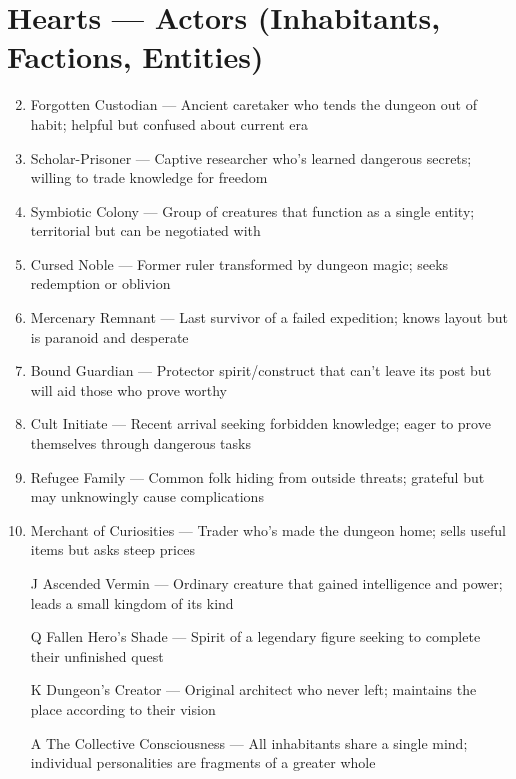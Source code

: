 \section*{Hearts --- Actors (Inhabitants, Factions, Entities)}
\begin{enumerate}
\setcounter{enumi}{1}
\item Forgotten Custodian --- Ancient caretaker who tends the dungeon out of habit; helpful but confused about current era
\item Scholar-Prisoner --- Captive researcher who's learned dangerous secrets; willing to trade knowledge for freedom
\item Symbiotic Colony --- Group of creatures that function as a single entity; territorial but can be negotiated with
\item Cursed Noble --- Former ruler transformed by dungeon magic; seeks redemption or oblivion
\item Mercenary Remnant --- Last survivor of a failed expedition; knows layout but is paranoid and desperate
\item Bound Guardian --- Protector spirit/construct that can't leave its post but will aid those who prove worthy
\item Cult Initiate --- Recent arrival seeking forbidden knowledge; eager to prove themselves through dangerous tasks
\item Refugee Family --- Common folk hiding from outside threats; grateful but may unknowingly cause complications
\item Merchant of Curiosities --- Trader who's made the dungeon home; sells useful items but asks steep prices
\item[J] Ascended Vermin --- Ordinary creature that gained intelligence and power; leads a small kingdom of its kind
\item[Q] Fallen Hero's Shade --- Spirit of a legendary figure seeking to complete their unfinished quest
\item[K] Dungeon's Creator --- Original architect who never left; maintains the place according to their vision
\item[A] The Collective Consciousness --- All inhabitants share a single mind; individual personalities are fragments of a greater whole
\end{enumerate}

